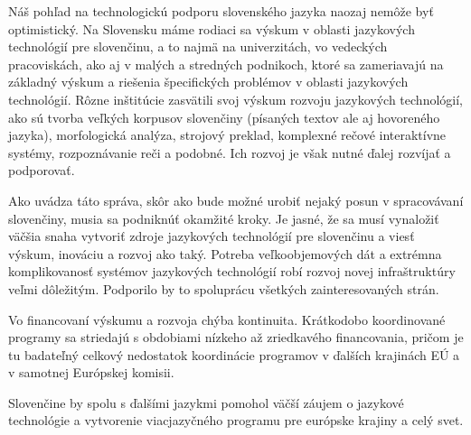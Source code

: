 \begin{multicols}{2}
Náš pohľad na technologickú podporu slovenského jazyka naozaj nemôže byť
optimistický. Na Slovensku máme rodiaci sa výskum v oblasti jazykových
technológií pre slovenčinu, a to najmä na univerzitách, vo vedeckých
pracoviskách, ako aj v malých a stredných podnikoch, ktoré sa zameriavajú na
základný výskum a riešenia špecifických problémov v oblasti jazykových
technológií. Rôzne inštitúcie zasvätili svoj výskum rozvoju jazykových
technológií, ako sú tvorba veľkých korpusov slovenčiny (písaných textov ale aj
hovoreného jazyka), morfologická analýza, strojový preklad, komplexné
rečové interaktívne systémy, rozpoznávanie reči a podobné.  Ich rozvoj je však
nutné ďalej rozvíjať a podporovať.

Ako uvádza táto správa, skôr ako bude možné urobiť nejaký posun v spracovávaní
slovenčiny, musia sa podniknúť okamžité kroky. Je jasné, že sa musí vynaložiť
väčšia snaha vytvoriť zdroje jazykových technológií pre slovenčinu a viesť
výskum, inováciu a rozvoj ako taký. Potreba veľkoobjemových dát a extrémna
komplikovanosť systémov jazykových technológií robí rozvoj novej infraštruktúry
veľmi dôležitým. Podporilo by to spoluprácu všetkých zainteresovaných strán.

Vo financovaní výskumu a rozvoja chýba kontinuita. Krátkodobo koordinované
programy sa striedajú s obdobiami nízkeho až zriedkavého financovania, pričom
je tu badateľný celkový nedostatok koordinácie programov v ďalších krajinách EÚ
a v samotnej Európskej komisii.

Slovenčine by spolu s ďalšími jazykmi pomohol väčší záujem o jazykové technológie a vytvorenie viacjazyčného programu pre európske krajiny a celý svet\cite{f32}.

\end{multicols}

\clearpage



